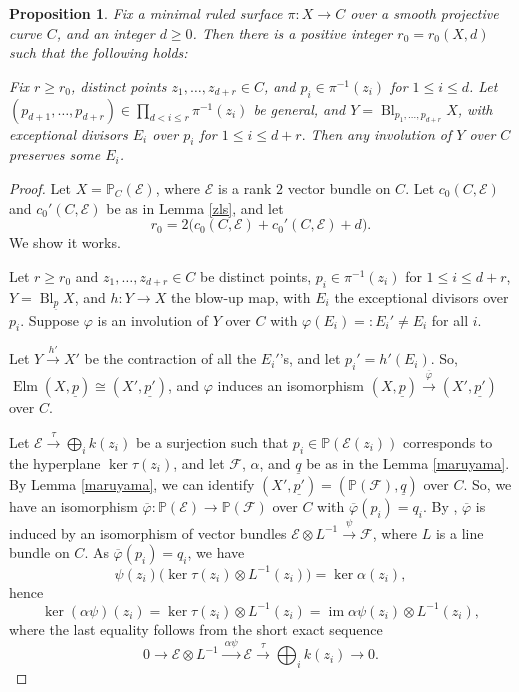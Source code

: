 \documentclass[11pt,letterpaper]{amsart}
\newtheorem{proposition}[lemma]{Proposition}
\begin{document}
\begin{proposition}\label{Propo1}
Fix a minimal ruled surface $\pi:X\to C$ over a smooth projective curve $C$, and an integer $d\ge0$. Then there is a positive integer $r_0=r_0(X,d)$ such that the following holds:

Fix $r\ge r_0$, distinct points $z_1,\ldots,z_{d+r}\in C$, and
$p_i\in\pi^{-1}(z_i)$ for $1\le i\le d$. Let
$(p_{d+1},\ldots,p_{d+r})\in\prod_{d<i\le r}\pi^{-1}(z_i)$
be general, and
$Y=\operatorname{Bl}_{p_1,\ldots,p_{d+r}}X$, with exceptional divisors $E_i$ over $p_i$ for $1\leq i\leq d+r.$
Then any involution of $Y$ over $C$ preserves some $E_i$.
\end{proposition}
\begin{proof}
   Let $X=\mathbb{P}_C(\mathcal{E})$, where $\mathcal{E}$ is a rank $2$ vector bundle on $C$. Let $c_0(C,\mathcal{E})$ and $c_0'(C,\mathcal{E})$ be as in Lemma \ref{zls}, and let
\[
r_0=2\bigl(c_0(C,\mathcal{E})+c_0'(C,\mathcal{E})+d\bigr).
\]
We show it works. 

Let $r\ge r_0$ and $z_1,\ldots,z_{d+r}\in C$ be distinct points, $p_i\in\pi^{-1}(z_i)$ for $1\le i\le d+r$, $Y=\operatorname{Bl}_{\underline{p}} X$, and $h:Y\to X$ the blow-up map, with $E_i$ the exceptional divisors over $p_i$.
Suppose $\varphi$ is an involution of $Y$ over $C$ with $\varphi(E_i)=:E_i'\ne E_i$ for all $i$.

Let $Y\xrightarrow{h'}X'$ be the contraction of all the $E_i'$'s, and let $p_i'=h'(E_i)$. So, $\operatorname{Elm}(X,\underline{p})\cong (X',\underline{p'})$,
and $\varphi$ induces an isomorphism $(X,\underline{p})\xrightarrow{\;\overline{\varphi}\;}(X',\underline{p'})$
over $C$.

Let $\mathcal{E}\xrightarrow{\tau}\bigoplus_i k(z_i)$
be a surjection such that $p_i\in\mathbb{P}(\mathcal{E}(z_i))$ corresponds to the hyperplane $\ker\tau(z_i)$, and let $\mathcal{F}$, $\alpha$, and $\underline{q}$ be as in the Lemma \ref{maruyama}. By Lemma \ref{maruyama}, we can identify $(X',\underline{p'})=(\mathbb{P}(\mathcal{F}),\underline{q})$
over $C$. So, we have an isomorphism $\overline{\varphi}:\mathbb{P}(\mathcal{E})\longrightarrow \mathbb{P}(\mathcal{F})$
over $C$ with $\overline{\varphi}(p_i)=q_i$. By \cite[Exercise II.7.10(d)]{hartshorne2013algebraic}, $\overline{\varphi}$ is induced by an isomorphism of vector bundles $\mathcal{E}\otimes L^{-1}\xrightarrow{\psi}\mathcal{F}$,
where $L$ is a line bundle on $C$. As $\overline{\varphi}(p_i)=q_i$, we have
\[
\psi(z_i)\bigl(\ker\tau(z_i)\otimes L^{-1}(z_i)\bigr)=\ker\alpha(z_i),
\]
hence
\[
\ker(\alpha\psi)(z_i)
=
\ker\tau(z_i)\otimes L^{-1}(z_i)
=
\operatorname{im}\alpha\psi(z_i)\otimes L^{-1}(z_i),
\]
where the last equality follows from the short exact sequence
\begin{equation}\label{alpha psi}
0\longrightarrow
\mathcal{E}\otimes L^{-1}
\xrightarrow{\ \alpha\psi\ }
\mathcal{E}
\xrightarrow{\ \tau\ }
\bigoplus_i k(z_i)
\longrightarrow0.
\end{equation}


\end{proof}
\end{document}
